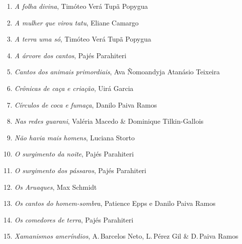 \vspace{-5mm}


\vspace{-5mm}

\begin{enumerate}
\setlength{\topsep}{2pt}
\setlength{\partopsep}{0pt}
\setlength\parskip{4.2pt}
\setlength\itemsep{-1.4mm}
\item \textit{A folha divina}, Timóteo Verá Tupã Popygua
\item \textit{A mulher que virou tatu}, Eliane Camargo
\item \textit{A terra uma só}, Timóteo Verá Tupã Popygua
\item \textit{A árvore dos cantos}, Pajés Parahiteri
\item \textit{Cantos dos animais primordiais}, Ava Ñomoandyja Atanásio Teixeira
\item \textit{Crônicas de caça e criação}, Uirá Garcia
\item \textit{Círculos de coca e fumaça}, Danilo Paiva Ramos
\item \textit{Nas redes guarani}, Valéria Macedo \& Dominique Tilkin-Gallois
\item \textit{Não havia mais homens}, Luciana Storto
\item \textit{O surgimento da noite}, Pajés Parahiteri
\item \textit{O surgimento dos pássaros}, Pajés Parahiteri
\item \textit{Os Aruaques}, Max Schmidt
\item \textit{Os cantos do homem-sombra}, Patience Epps e Danilo Paiva Ramos
\item \textit{Os comedores de terra}, Pajés Parahiteri
\item \textit{Xamanismos ameríndios}, A.\,Barcelos Neto, L.\,Pérez Gil \& D.\,Paiva Ramos
\end{enumerate}

